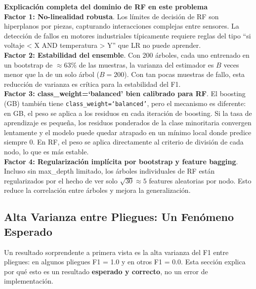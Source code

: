 \documentclass[12pt,a4paper]{article}
\begin{document}
\begin{porquebox}
\textbf{Explicaci\'{o}n completa del dominio de RF en este problema}\\[4pt]
\textbf{Factor 1: No-linealidad robusta}. Los l\'{i}mites de decisi\'{o}n de RF son
hiperplanos por piezas, capturando interacciones complejas entre sensores. La
detecci\'{o}n de fallos en motores industriales t\'{i}picamente requiere reglas
del tipo ``si voltaje < X AND temperatura > Y'' que LR no puede aprender.\\[4pt]
\textbf{Factor 2: Estabilidad del ensemble}. Con 200 \'{a}rboles, cada uno entrenado
en un bootstrap de $\approx 63\%$ de las muestras, la varianza del estimador es
$B$ veces menor que la de un solo \'{a}rbol ($B=200$). Con tan pocas muestras de
fallo, esta reducci\'{o}n de varianza es cr\'{i}tica para la estabilidad del F1.\\[4pt]
\textbf{Factor 3: class\_weight=`balanced' bien calibrado para RF}. El boosting (GB)
tambi\'{e}n tiene \texttt{class\_weight=`balanced'}, pero el mecanismo es diferente:
en GB, el peso se aplica a los residuos en cada iteraci\'{o}n de boosting. Si la tasa
de aprendizaje es peque\~{n}a, los residuos ponderados de la clase minoritaria convergen
lentamente y el modelo puede quedar atrapado en un m\'{i}nimo local donde predice siempre
0. En RF, el peso se aplica directamente al criterio de divisi\'{o}n de cada nodo,
lo que es m\'{a}s estable.\\[4pt]
\textbf{Factor 4: Regularizaci\'{o}n impl\'{i}cita por bootstrap y feature bagging}.
Incluso sin max\_depth limitado, los \'{a}rboles individuales de RF est\'{a}n regularizados
por el hecho de ver solo $\sqrt{30} \approx 5$ features aleatorias por nodo. Esto
reduce la correlaci\'{o}n entre \'{a}rboles y mejora la generalizaci\'{o}n.
\end{porquebox}

\subsection{Alta Varianza entre Pliegues: Un Fen\'{o}meno Esperado}

Un resultado sorprendente a primera vista es la alta varianza del F1 entre pliegues:
en algunos pliegues F1 = 1.0 y en otros F1 = 0.0. Esta secci\'{o}n explica por qu\'{e}
esto es un resultado \textbf{esperado y correcto}, no un error de implementaci\'{o}n.
\end{document}
